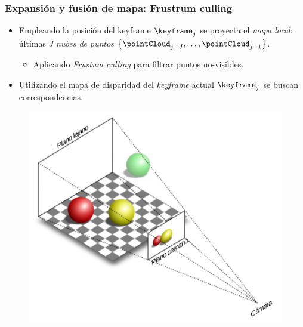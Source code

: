 \begin{frame}
	\frametitle{Expansión y fusión de mapa: Frustrum culling}
	\begin{itemize}
		\item Empleando la posición del keyframe $\keyframe_{j}$ se proyecta el \emph{mapa local}: últimas $J$ \emph{nubes de puntos} $\left\{ \pointCloud_{j-J},\hdots,\pointCloud_{j-1}\right\}$.
		\begin{itemize}
			\item Aplicando \emph{Frustum culling} para filtrar puntos no-visibles.
		\end{itemize}
	\item Utilizando el mapa de disparidad del \emph{keyframe} actual $\keyframe_{j}$ se buscan correspondencias.
	\end{itemize}
	
	\begin{figure}[htb]
		\centering
		\includegraphics[width=0.6\columnwidth]{method/frustum_culling.pdf}
	\end{figure}

\end{frame}

